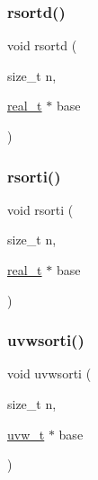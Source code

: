 \mbox{\label{a00206_a13855928d837857052613775a9c389b5}} 
\subsubsection{\texorpdfstring{rsortd()}{rsortd()}}
{\footnotesize\ttfamily void rsortd (\begin{DoxyParamCaption}\item[{size\+\_\+t}]{n,  }\item[{\hyperlink{a00876_a1924a4f6907cc3833213aba1f07fcbe9}{real\+\_\+t} $\ast$}]{base }\end{DoxyParamCaption})}

\mbox{\label{a00206_aa5a65b8ee3ec8f704ad120d4381cc79a}} 
\subsubsection{\texorpdfstring{rsorti()}{rsorti()}}
{\footnotesize\ttfamily void rsorti (\begin{DoxyParamCaption}\item[{size\+\_\+t}]{n,  }\item[{\hyperlink{a00876_a1924a4f6907cc3833213aba1f07fcbe9}{real\+\_\+t} $\ast$}]{base }\end{DoxyParamCaption})}

\mbox{\label{a00206_a26aa6506404f80ed9e0b48249f4d4748}} 
\subsubsection{\texorpdfstring{uvwsorti()}{uvwsorti()}}
{\footnotesize\ttfamily void uvwsorti (\begin{DoxyParamCaption}\item[{size\+\_\+t}]{n,  }\item[{\hyperlink{a00710}{uvw\+\_\+t} $\ast$}]{base }\end{DoxyParamCaption})}

